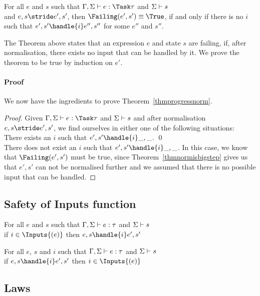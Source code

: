 \begin{theorem}
  For all $e$ and $s$ such that $\Gamma,\Sigma\infers e:\Task\tau$ and $\Sigma\vdash s$\\
  and $e,s\stride e',s'$, then $\Failing(e',s')\equiv \True$, if and only if there is no $i$ such that $e',s'\handle{i}e'',s''$ for some $e''$ and $s''$.
  \label{thmfailing}
\end{theorem}

The Theorem above states that an expression $e$ and state $s$ are failing, if,
after normalisation, there exists no input that can be handled by it.
We prove the theorem to be true by induction on $e'$.

\paragraph{Proof}

We now have the ingredients to prove Theorem~\ref{thmprogressnorm}.

\begin{proof}
  Given $\Gamma,\Sigma\infers e:\Task\tau$ and $\Sigma\vdash s$ and after
  normalisation $e,s \stride e',s'$, we find ourselves in either one of the
  following situations:\\

  There exists an $i$ such that $e',s'\handle{i}\_,\_$. \qed\\

  There does not exist an $i$ such that $e',s'\handle{i}\_,\_$. In this case, we
  know that $\Failing(e',s')$ must be true, since Theorem~\ref{thmnormisbigstep}
  gives us that $e',s'$ can not be normalised further and we assumed that there
  is no possible input that can be handled.
\end{proof}





\subsection{Safety of Inputs function}

\begin{theorem}
  For all $e$ and $s$ such that $\Gamma,\Sigma\vdash e:\tau$ and $\Sigma\vdash s$\\
  if $i\in\Inputs{(e)}$ then $e,s\handle{i}e',s'$
  \label{thmsafetyi1}
\end{theorem}

\begin{theorem}
  For all $e$, $s$ and $i$ such that $\Gamma,\Sigma\vdash e:\tau$ and $\Sigma\vdash s$\\
  if $e,s\handle{i}e',s'$ then  $i\in\Inputs{(e)}$
  \label{thmsafetyi2}
\end{theorem}
\subsection{Laws}
